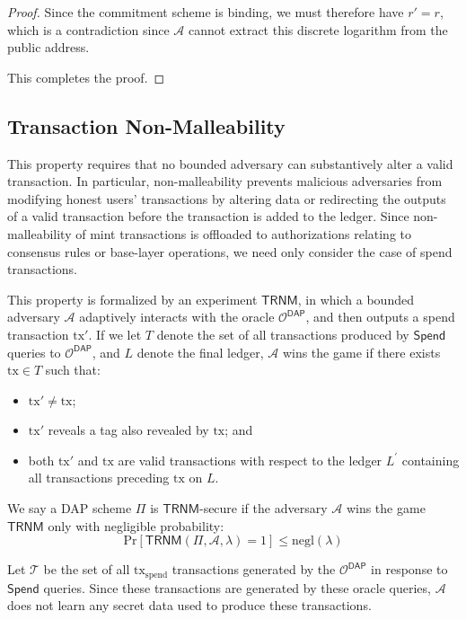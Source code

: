 \documentclass{llncs}
\newcommand{\func}[1]{\mathsf{#1}}
\newcommand{\oracle}{\mathcal{O}^{\func{DAP}}}
\begin{document}
\begin{proof}
Since the commitment scheme is binding, we must therefore have $r' = r$, which is a contradiction since $\mathcal{A}$ cannot extract this discrete logarithm from the public address.

This completes the proof.
\end{proof}


\subsection{Transaction Non-Malleability}

This property requires that no bounded adversary can substantively alter a valid transaction. 
In particular, non-malleability prevents malicious adversaries from modifying honest users' transactions by altering data or redirecting the outputs of a valid transaction before the transaction is added to the ledger.
Since non-malleability of mint transactions is offloaded to authorizations relating to consensus rules or base-layer operations, we need only consider the case of spend transactions.

This property is formalized by an experiment $\func{TRNM}$, in which a bounded adversary $\mathcal{A}$ adaptively interacts with the oracle $\oracle$, and then outputs a spend transaction $\text{tx}'$.
If we let $T$ denote the set of all transactions produced by $\func{Spend}$ queries to $\oracle$, and $L$ denote the final ledger, $\mathcal{A}$ wins the game if there exists $\text{tx} \in T$ such that:
\begin{itemize}
    \item $\text{tx}' \neq \text{tx}$; 
    \item $\text{tx}'$ reveals a tag also revealed by $\text{tx}$; and
    \item both $\text{tx}'$ and $\text{tx}$ are valid transactions with respect to the ledger $L^{\prime}$ containing all transactions preceding $\text{tx}$ on $L$.
\end{itemize}

We say a DAP scheme $\Pi$ is $\func{TRNM}$-secure if the adversary $\mathcal{A}$ wins the game $\func{TRNM}$ only with negligible probability:
$$\text{Pr}[\func{TRNM}(\Pi, \mathcal{A}, \lambda) = 1] \leq \text{negl}(\lambda)$$

Let $\mathcal{T}$ be the set of all $\text{tx}_{\text{spend}}$ transactions generated by the $\oracle$ in response to $\func{Spend}$ queries.
Since these transactions are generated by these oracle queries, $\mathcal{A}$ does not learn any secret data used to produce these transactions.
\end{document}
